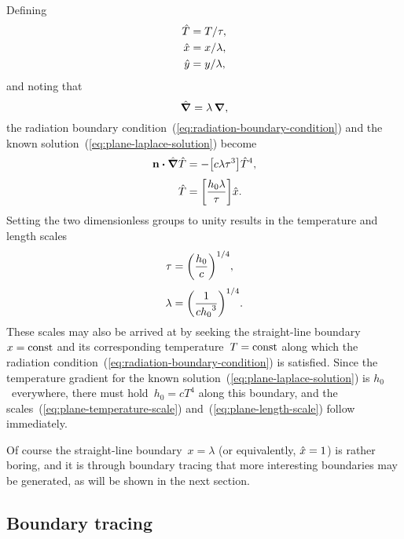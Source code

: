 Defining
\begin{align}
  \hat{T} &= T / \tau, \label{eq:plane-scaled-temperature} \\
  \hat{x} &= x / \lambda, \label{eq:plane-scaled-x} \\
  \hat{y} &= y / \lambda, \label{eq:plane-scaled-y}
\end{align}
and noting that
\begin{equation}
  \mathop{}\!\hat{\mathop{}\!\boldsymbol{\mathbf{\nabla}}} = \lambda \mathop{}\!\boldsymbol{\mathbf{\nabla}},
  \label{eq:plane-scaled-del}
\end{equation}
the radiation boundary condition~(\ref{eq:radiation-boundary-condition})
and the known solution~(\ref{eq:plane-laplace-solution})
become
\begin{align}
  \normalvec \dotp \scaleddel \scaled{T}
    &= -\group{c \lambda \tau^3} \scaled{T}^4,
    \label{eq:plane-scaled-radiation-boundary-condition-with-groups}
    \\[\tallspace]
  \scaled{T}
    &= \group{\frac{h_0 \lambda}{\tau}} \scaled{x}.
    \label{eq:plane-scaled-laplace-solution-with-groups}
\end{align}
Setting the two dimensionless groups to unity
results in the temperature and length scales
\begin{align}
  \tau &= \roundbr*{\frac{h_0}{c}}^{1/4},
    \label{eq:plane-temperature-scale} \\[\tallspace]
  \lambda &= \roundbr*{\frac{1}{c {h_0}^3}}^{1/4}.
    \label{eq:plane-length-scale}
\end{align}
These scales may also be arrived at
by seeking the straight-line boundary~$x = \mathrm{const}$
and its corresponding temperature~$T = \mathrm{const}$
along which the radiation condition~(\ref{eq:radiation-boundary-condition})
is satisfied.
Since the temperature gradient
for the known solution~(\ref{eq:plane-laplace-solution})
is $h_0$~everywhere,
there must hold~$h_0 = c T^4$ along this boundary,
and the scales~(\ref{eq:plane-temperature-scale})
and~(\ref{eq:plane-length-scale}) follow immediately.

Of course the straight-line boundary~$x = \lambda$
(or equivalently, $\hat{x} = 1$)
is rather boring,
and it is through boundary tracing
that more interesting boundaries may be generated,
as will be shown in the next section.

\subsection{Boundary tracing}
\label{sec:cartesian.plane.tracing}

